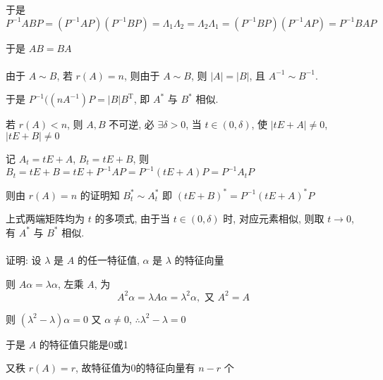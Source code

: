          于是 \( P^{-1}ABP = (P^{-1}AP)(P^{-1}BP) = \Lambda_{1}\Lambda_{2} = \Lambda_{2}\Lambda_{1} = (P^{-1}BP)(P^{-1}AP) = P^{-1}BAP \)

         于是 \( AB = BA \)


     \paragraph{} %
         由于 \( A \sim B \), 若 \( r(A) = n \), 则由于 \( A \sim B \), 则 \( |A| = |B| \), 且 \( A^{-1} \sim B^{-1} \).

         于是 \( P^{-1}((nA^{-1})P = |B|B^{\mathrm{T}} \), 即 \( A^{*} \) 与 \( B^{*} \) 相似.

         若 \( r(A) < n \), 则 \( A, B \) 不可逆, 必 \( \exists \delta > 0 \), 当 \( t \in (0,\delta) \), 使 \( |tE+A| \neq 0 \), \( |tE+B| \neq 0 \)

         记 \( A_{t} = tE+A \), \( B_{t} = tE+B \), 则 \( B_{t} = tE+B = tE+P^{-1}AP = P^{-1}(tE+A)P = P^{-1}A_{t}P \)

         则由 \( r(A) = n \) 的证明知 \( B_{t}^{*} \sim A_{t}^{*} \) 即 \( (tE+B)^{*} = P^{-1}(tE+A)^{*}P \)

         上式两端矩阵均为 \( t \) 的多项式, 由于当 \( t \in (0,\delta) \) 时, 对应元素相似, 则取 \( t \to 0 \), 有 \( A^{*} \) 与 \( B^{*} \) 相似.


     \paragraph{} %
         证明: 设 \( \lambda \) 是 \( A \) 的任一特征值, \( \alpha \) 是 \( \lambda \) 的特征向量

         则 \( A\alpha = \lambda\alpha \), 左乘 \( A \), 为
         \[ A^{2}\alpha = \lambda A\alpha = \lambda^{2}\alpha, \text{ 又 } A^{2} = A \]

         则 \( (\lambda^{2}-\lambda)\alpha = 0 \) 又 \( \alpha \neq 0 \), \( \therefore \lambda^{2}-\lambda = 0 \)

         于是 \( A \) 的特征值只能是0或1

         又秩 \( r(A) = r \), 故特征值为0的特征向量有 \( n-r \) 个

